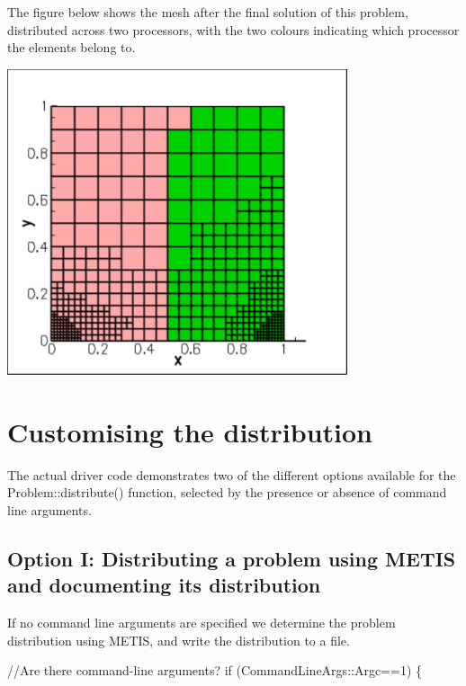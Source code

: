 The figure below shows the mesh after the final solution of this problem, distributed across two processors, with the two colours indicating which processor the elements belong to.

 
\begin{DoxyImage}
\includegraphics[width=0.75\textwidth]{partition}
\end{DoxyImage}




\hypertarget{index_distribution}{}\section{Customising the distribution}\label{index_distribution}
The actual driver code demonstrates two of the different options available for the {\ttfamily Problem\+::distribute()} function, selected by the presence or absence of command line arguments.\hypertarget{index_no_disk}{}\subsection{Option I\+: Distributing a problem using M\+E\+T\+I\+S and documenting its distribution}\label{index_no_disk}
If no command line arguments are specified we determine the problem distribution using {\ttfamily M\+E\+T\+IS}, and write the distribution to a file.


\begin{DoxyCodeInclude}
  \textcolor{comment}{//Are there command-line arguments?}
  \textcolor{keywordflow}{if} (CommandLineArgs::Argc==1)
   \{

\end{DoxyCodeInclude}


